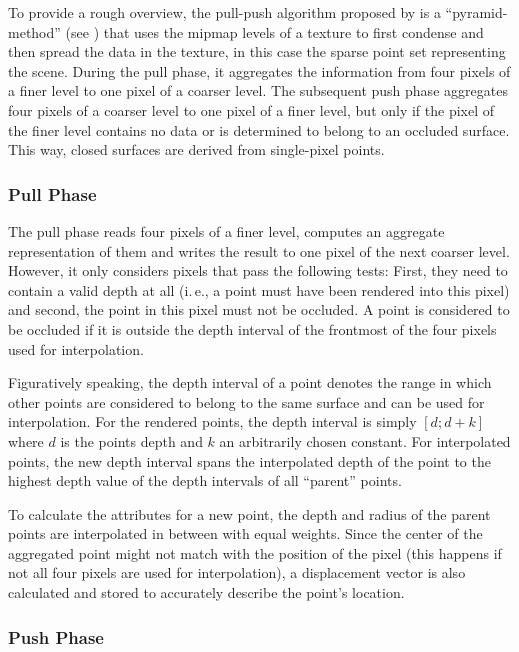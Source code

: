 To provide a rough overview, the pull-push algorithm proposed by \citet{Marroquim:2007:reconstruction} is a ``pyramid-method'' (see \cite{Strengert:2006:Pyramid}) that uses the mipmap levels of a texture to first condense and then spread the data in the texture, in this case the sparse point set representing the scene. During the pull phase, it aggregates the information from four pixels of a finer level to one pixel of a coarser level. The subsequent push phase aggregates four pixels of a coarser level to one pixel of a finer level, but only if the pixel of the finer level contains no data or is determined to belong to an occluded surface. This way, closed surfaces are derived from single-pixel points.

\subsubsection{Pull Phase}
The pull phase reads four pixels of a finer level, computes an aggregate representation of them and writes the result to one pixel of the next coarser level. However, it only considers pixels that pass the following tests: First, they need to contain a valid depth at all (i.\,e., a point must have been rendered into this pixel) and second, the point in this pixel must not be occluded. A point is considered to be occluded if it is outside the depth interval of the frontmost of the four pixels used for interpolation.

Figuratively speaking, the depth interval of a point denotes the range in which other points are considered to belong to the same surface and can be used for interpolation. For the rendered points, the depth interval is simply $[d;d+k]$ where $d$ is the points depth and $k$ an arbitrarily chosen constant. For interpolated points, the new depth interval spans the interpolated depth of the point to the highest depth value of the depth intervals of all ``parent'' points.

To calculate the attributes for a new point, the depth and radius of the parent points are interpolated in between with equal weights. Since the center of the aggregated point might not match with the position of the pixel (this happens if not all four pixels are used for interpolation), a displacement vector is also calculated and stored to accurately describe the point's location.


\subsubsection{Push Phase}

